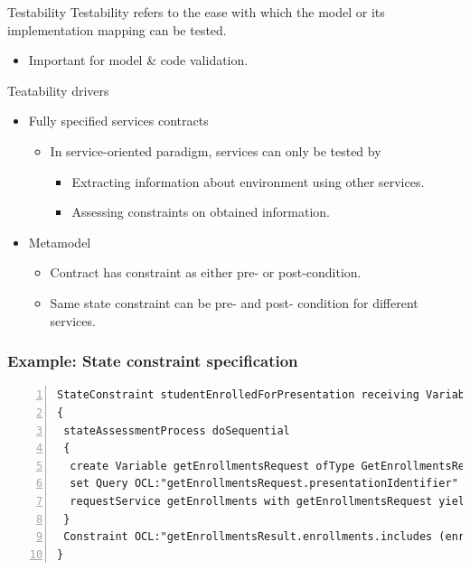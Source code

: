 \begin{frame}{Testability}
  Testability refers to the ease with which the model or its implementation mapping can be tested.
    \begin{itemize}
     \item Important for model \& code validation.
    \end{itemize}
  \pause
  \begin{block}{Teatability drivers}
	 \begin{itemize}
		\item<+-| alert@+> Fully specified services contracts
		  \begin{itemize}
			 \item In service-oriented paradigm, services can only be tested by
				\begin{itemize}
				  \item Extracting information about environment using other services.
				  \item Assessing constraints on obtained information.
				\end{itemize}
		  \end{itemize}
		\item<+-| alert@+> Metamodel
		  \begin{itemize}
			 \item Contract has constraint as either pre- or post-condition.
			 \item Same state constraint can be pre- and post- condition for different services.
		  \end{itemize}
	 \end{itemize}
  \end{block}
\end{frame}


\begin{frame}[fragile]
\frametitle{Example: State constraint specification}

\lstset{language=urdad,label=serviceTextSyntax}
\begin{lstlisting}[numbers=left,escapechar=|]
StateConstraint studentEnrolledForPresentation receiving Variable enrollForPresentationRequest ofType EnrollForPresentationRequest
{
 stateAssessmentProcess doSequential
 {
  create Variable getEnrollmentsRequest ofType GetEnrollmentsRequest
  set Query OCL:"getEnrollmentsRequest.presentationIdentifier" equalTo Query OCL:"enrollForPresentationRequest.presentationIdentifier"
  requestService getEnrollments with getEnrollmentsRequest yielding Variable getEnrollmentsResult ofType GetEnrollmentsResult
 }
 Constraint OCL:"getEnrollmentsResult.enrollments.includes (enrollForPresentationRequest.personIdentifier)"
}
\end{lstlisting}
\end{frame}

